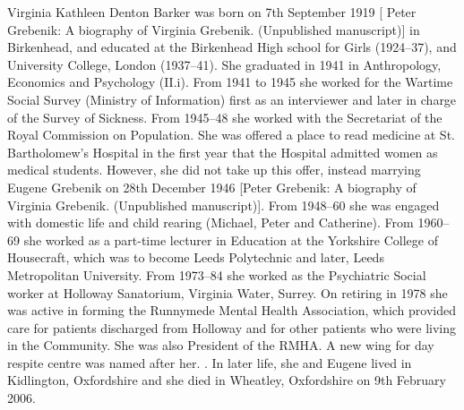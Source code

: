 
Virginia Kathleen Denton Barker was born on 7th September 1919 [ Peter Grebenik: A biography of Virginia Grebenik. (Unpublished manuscript)] in Birkenhead, and educated at the Birkenhead High school for Girls (1924--37), and University College, London (1937--41). She graduated in 1941 in Anthropology, Economics and Psychology (II.i). From 1941 to 1945 she worked for the Wartime Social Survey (Ministry of Information) first as an interviewer and later in charge of the Survey of Sickness. From 1945--48 she worked with the Secretariat of the Royal Commission on Population. She was offered a place to read medicine at St. Bartholomew's Hospital in the first year that the Hospital admitted women as medical students. However, she did not take up this offer, instead marrying Eugene Grebenik on 28th December 1946 [Peter Grebenik: A biography of Virginia Grebenik. (Unpublished manuscript)]. From 1948--60 she was engaged with domestic life and child rearing  (Michael, Peter and Catherine). From 1960--69 she worked as a part-time lecturer in Education at the Yorkshire College of Housecraft, which was to become Leeds Polytechnic and later, Leeds Metropolitan University. From 1973--84 she worked as the Psychiatric Social worker at Holloway Sanatorium, Virginia Water, Surrey. On retiring in 1978 she was active in forming the Runnymede Mental Health Association, which provided care for patients discharged from Holloway and for other patients who were living in the Community. She was also President of the RMHA. A new wing for day respite centre was named after her. \cite{VirginiaDocs}.
In later life, she and Eugene lived in Kidlington, Oxfordshire and she died in Wheatley, Oxfordshire  on 9th February 2006.
